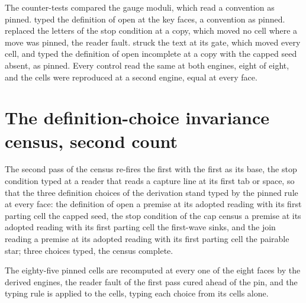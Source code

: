 \begin{chproof}[instrument]
The counter-tests compared the gauge moduli, which read a convention as pinned. typed the definition of open at the key faces, a convention as pinned. replaced the letters of the stop condition at a copy, which moved no cell where a move was pinned, the reader fault. struck the text at its gate, which moved every cell, and typed the definition of open incomplete at a copy with the capped seed absent, as pinned. Every control read the same at both engines, eight of eight, and the cells were reproduced at a second engine, equal at every face.
\end{chproof}
\section{The definition-choice invariance census, second count}\label{mod:I-1-D538500-the-definition-choice-invariance-census}
\begin{chtable}\label{box:I-1-D538500-the-definition-choice-invariance-census:1}
The second pass of the census re-fires the first with the first as its base, the stop condition typed at a reader that reads a capture line at its first tab or space, so that the three definition choices of the derivation stand typed by the pinned rule at every face: the definition of open a premise at its adopted reading with its first parting cell the capped seed, the stop condition of the cap census a premise at its adopted reading with its first parting cell the first-wave sinks, and the join reading a premise at its adopted reading with its first parting cell the pairable star; three choices typed, the census complete.
\end{chtable}
The eighty-five pinned cells are recomputed at every one of the eight faces by the derived engines, the reader fault of the first pass cured ahead of the pin, and the typing rule is applied to the cells, typing each choice from its cells alone.

